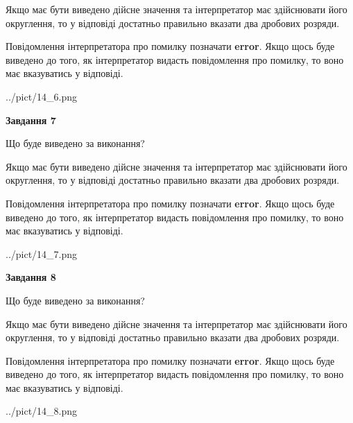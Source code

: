 \documentclass[12pt, ukrainian]{article}
\begin{document}
{\begin {Large}
Якщо має бути виведено дійсне значення та інтерпретатор має здійснювати його округлення, 
то у відповіді достатньо правильно вказати два дробових розряди.

Повідомлення інтерпретатора про помилку позначати \textbf{error}.
Якщо щось буде виведено до того, як інтерпретатор видасть повідомлення про помилку, 
то воно має вказуватись у відповіді. \par

\begin{center}
	{../pict/14_6.png}
\end{center}
\newpage

{\begin {center}\textbf{Завдання 7}\end {center}}\par
Що буде виведено за виконання? \par

Якщо має бути виведено дійсне значення та інтерпретатор має здійснювати його округлення, 
то у відповіді достатньо правильно вказати два дробових розряди.

Повідомлення інтерпретатора про помилку позначати \textbf{error}.
Якщо щось буде виведено до того, як інтерпретатор видасть повідомлення про помилку, 
то воно має вказуватись у відповіді. \par

\begin{center}
	{../pict/14_7.png}
\end{center}
\newpage

{\begin {center}\textbf{Завдання 8}\end {center}}\par
Що буде виведено за виконання? \par

Якщо має бути виведено дійсне значення та інтерпретатор має здійснювати його округлення, 
то у відповіді достатньо правильно вказати два дробових розряди.

Повідомлення інтерпретатора про помилку позначати \textbf{error}.
Якщо щось буде виведено до того, як інтерпретатор видасть повідомлення про помилку, 
то воно має вказуватись у відповіді. \par

\begin{center}
	{../pict/14_8.png}
\end{center}
\newpage


\end{Large}}
\end{document}
